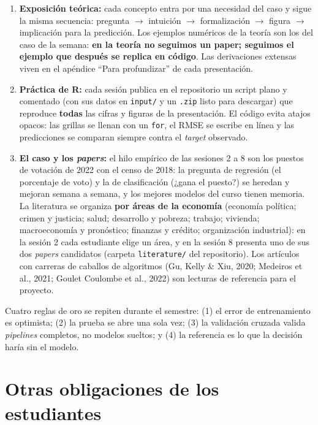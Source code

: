 \documentclass[12pt,a4paper]{article}
\begin{document}
\begin{enumerate}
    \item \textbf{Exposición teórica:} cada concepto entra por una necesidad del caso y sigue la misma secuencia: pregunta $\rightarrow$ intuición $\rightarrow$ formalización $\rightarrow$ figura $\rightarrow$ implicación para la predicción. Los ejemplos numéricos de la teoría son los del caso de la semana: \textbf{en la teoría no seguimos un paper; seguimos el ejemplo que después se replica en código}. Las derivaciones extensas viven en el apéndice ``Para profundizar'' de cada presentación.

    \item \textbf{Práctica de R:} cada sesión publica en el repositorio un script plano y comentado (con sus datos en \texttt{input/} y un \texttt{.zip} listo para descargar) que reproduce \textbf{todas} las cifras y figuras de la presentación. El código evita atajos opacos: las grillas se llenan con un \texttt{for}, el RMSE se escribe en línea y las predicciones se comparan siempre contra el \emph{target} observado.

    \item \textbf{El caso y los \emph{papers}:} el hilo empírico de las sesiones 2 a 8 son los puestos de votación de 2022 con el censo de 2018: la pregunta de regresión (el porcentaje de voto) y la de clasificación (¿gana el puesto?) se heredan y mejoran semana a semana, y los mejores modelos del curso tienen memoria. La literatura se organiza \textbf{por áreas de la economía} (economía política; crimen y justicia; salud; desarrollo y pobreza; trabajo; vivienda; macroeconomía y pronóstico; finanzas y crédito; organización industrial): en la sesión 2 cada estudiante elige un área, y en la sesión 8 presenta uno de sus dos \emph{papers} candidatos (carpeta \texttt{literature/} del repositorio). Los artículos con carreras de caballos de algoritmos (Gu, Kelly \& Xiu, 2020; Medeiros et al., 2021; Goulet Coulombe et al., 2022) son lecturas de referencia para el proyecto.
\end{enumerate}

Cuatro reglas de oro se repiten durante el semestre: (1) el error de entrenamiento es optimista; (2) la prueba se abre una sola vez; (3) la validación cruzada valida \emph{pipelines} completos, no modelos sueltos; y (4) la referencia es lo que la decisión haría sin el modelo.

\section{Otras obligaciones de los estudiantes}
\end{document}

